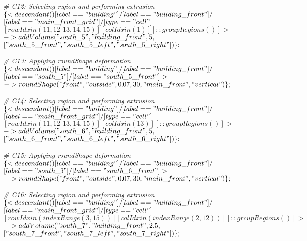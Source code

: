 \noindent \textit{\# C12: Selecting region and performing extrusion}\\
$\{< descendant() [label=="building"] / [label=="building\_front"] / $\\
$[label=="main\_front\_grid"] / [type=="cell"] $\\
$[rowIdx in (11, 12, 13, 14, 15)] [colIdx in (1)] [::groupRegions()] > $\\
$-> addVolume("south\_5", "building\_front", 5, $\\
$["south\_5\_front", "south\_5\_left", "south\_5\_right"])\};$

\noindent \textit{\# C13: Applying roundShape deformation}\\
$\{< descendant() [label=="building"] / [label=="building\_front"] / $\\
$[label=="south\_5"] / [label=="south\_5\_front"] > $\\
$-> roundShape("front", "outside", 0.07, 30, "main\_front", "vertical")\};$

\noindent \textit{\# C14: Selecting region and performing extrusion}\\
$\{< descendant() [label=="building"] / [label=="building\_front"] / $\\
$[label=="main\_front\_grid"] / [type=="cell"] $\\
$[rowIdx in (11, 12, 13, 14, 15)] [colIdx in (13)] [::groupRegions()] > $\\
$-> addVolume("south\_6", "building\_front", 5, $\\
$["south\_6\_front", "south\_6\_left", "south\_6\_right"])\};$

\noindent \textit{\# C15: Applying roundShape deformation}\\
$\{< descendant() [label=="building"] / [label=="building\_front"] / $\\
$[label=="south\_6"] / [label=="south\_6\_front"] > $\\
$-> roundShape("front", "outside", 0.07, 30, "main\_front", "vertical")\};$

\noindent \textit{\# C16: Selecting region and performing extrusion}\\
$\{< descendant() [label=="building"] / [label=="building\_front"] / $\\
$[label=="main\_front\_grid"] / [type=="cell"] $\\
$[rowIdx in (indexRange(3, 15))] [colIdx in (indexRange(2, 12))] [::groupRegions()] > $\\
$-> addVolume("south\_7", "building\_front", 2.5, $\\
$["south\_7\_front", "south\_7\_left", "south\_7\_right"])\};$

